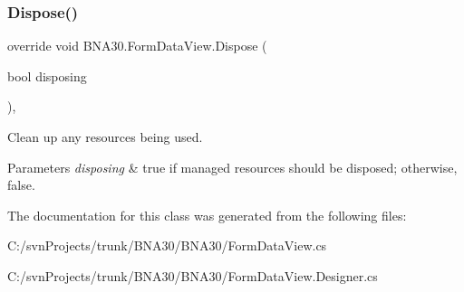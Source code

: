 \subsubsection{\texorpdfstring{Dispose()}{Dispose()}}
{\footnotesize\ttfamily override void B\+N\+A30.\+Form\+Data\+View.\+Dispose (\begin{DoxyParamCaption}\item[{bool}]{disposing }\end{DoxyParamCaption})\hspace{0.3cm}{\ttfamily [inline]}, {\ttfamily [protected]}}



Clean up any resources being used. 


\begin{DoxyParams}{Parameters}
{\em disposing} & true if managed resources should be disposed; otherwise, false.\\
\hline
\end{DoxyParams}


The documentation for this class was generated from the following files\+:\begin{DoxyCompactItemize}
\item 
C\+:/svn\+Projects/trunk/\+B\+N\+A30/\+B\+N\+A30/Form\+Data\+View.\+cs\item 
C\+:/svn\+Projects/trunk/\+B\+N\+A30/\+B\+N\+A30/Form\+Data\+View.\+Designer.\+cs\end{DoxyCompactItemize}
